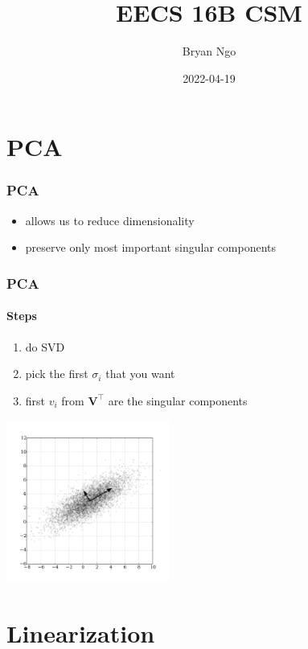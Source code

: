 \documentclass[aspectratio=169]{beamer}
\title{EECS 16B CSM}
\author{Bryan Ngo}
\date{2022-04-19}
\institute{UC Berkeley}
\newcommand{\tpose}[1]{#1^\top}
\begin{document}
\begin{frame}
    \maketitle
\end{frame}

\begin{frame}
    \tableofcontents
\end{frame}

\section{PCA}

\begin{frame}
    \frametitle{PCA}

    \begin{itemize}
        \item allows us to reduce dimensionality
        \item preserve only most important singular components
    \end{itemize}
\end{frame}

\begin{frame}
    \frametitle{PCA}
    \framesubtitle{Steps}

    \begin{enumerate}
        \item do SVD
        \item pick the first \(\sigma_i\) that you want
        \item first \(v_i\) from \(\tpose{\bm{V}}\) are the singular components
    \end{enumerate}
    \includegraphics[width=0.4\textwidth]{1024px-GaussianScatterPCA.svg.png}
\end{frame}

\section{Linearization}
\end{document}
